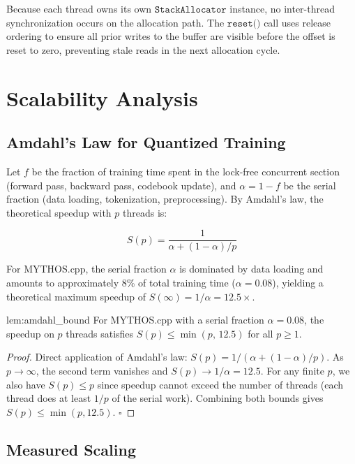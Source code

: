 Because each thread owns its own $\texttt{StackAllocator}$ instance, no inter-thread synchronization occurs on the allocation path. The $\texttt{reset()}$ call uses release ordering to ensure all prior writes to the buffer are visible before the offset is reset to zero, preventing stale reads in the next allocation cycle.

\section{Scalability Analysis}
\label{sec:scalability}

\subsection{Amdahl's Law for Quantized Training}

Let $f$ be the fraction of training time spent in the lock-free concurrent section (forward pass, backward pass, codebook update), and $\alpha = 1-f$ be the serial fraction (data loading, tokenization, preprocessing). By Amdahl's law, the theoretical speedup with $p$ threads is:

\begin{equation}
S(p) = \frac{1}{\alpha + (1 - \alpha)/p}
\end{equation}

For MYTHOS.cpp, the serial fraction $\alpha$ is dominated by data loading and amounts to approximately 8\% of total training time ($\alpha = 0.08$), yielding a theoretical maximum speedup of $S(\infty) = 1/\alpha = 12.5\times$.

\begin{mylemma}{lem:amdahl_bound}
For MYTHOS.cpp with a serial fraction $\alpha = 0.08$, the speedup on $p$ threads satisfies $S(p) \leq \min(p, \, 12.5)$ for all $p \geq 1$.
\end{mylemma}

\begin{proof}
Direct application of Amdahl's law: $S(p) = 1/(\alpha + (1-\alpha)/p)$. As $p \to \infty$, the second term vanishes and $S(p) \to 1/\alpha = 12.5$. For any finite $p$, we also have $S(p) \leq p$ since speedup cannot exceed the number of threads (each thread does at least $1/p$ of the serial work). Combining both bounds gives $S(p) \leq \min(p, 12.5)$. $\square$
\end{proof}

\subsection{Measured Scaling}

